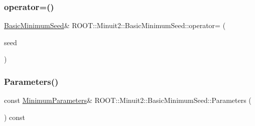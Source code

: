 \mbox{\label{classROOT_1_1Minuit2_1_1BasicMinimumSeed_aeffefca123cbfd95d19fa7fb7e087431}} 
\subsubsection{\texorpdfstring{operator=()}{operator=()}\hspace{0.1cm}{\footnotesize\ttfamily [3/3]}}
{\footnotesize\ttfamily \mbox{\hyperlink{classROOT_1_1Minuit2_1_1BasicMinimumSeed}{Basic\+Minimum\+Seed}}\& R\+O\+O\+T\+::\+Minuit2\+::\+Basic\+Minimum\+Seed\+::operator= (\begin{DoxyParamCaption}\item[{const \mbox{\hyperlink{classROOT_1_1Minuit2_1_1BasicMinimumSeed}{Basic\+Minimum\+Seed}} \&}]{seed }\end{DoxyParamCaption})\hspace{0.3cm}{\ttfamily [inline]}}

\mbox{\label{classROOT_1_1Minuit2_1_1BasicMinimumSeed_a0aec3622cdc4f1c52a4be74f8b96059a}} 
\subsubsection{\texorpdfstring{Parameters()}{Parameters()}\hspace{0.1cm}{\footnotesize\ttfamily [1/3]}}
{\footnotesize\ttfamily const \mbox{\hyperlink{classROOT_1_1Minuit2_1_1MinimumParameters}{Minimum\+Parameters}}\& R\+O\+O\+T\+::\+Minuit2\+::\+Basic\+Minimum\+Seed\+::\+Parameters (\begin{DoxyParamCaption}{ }\end{DoxyParamCaption}) const\hspace{0.3cm}{\ttfamily [inline]}}


